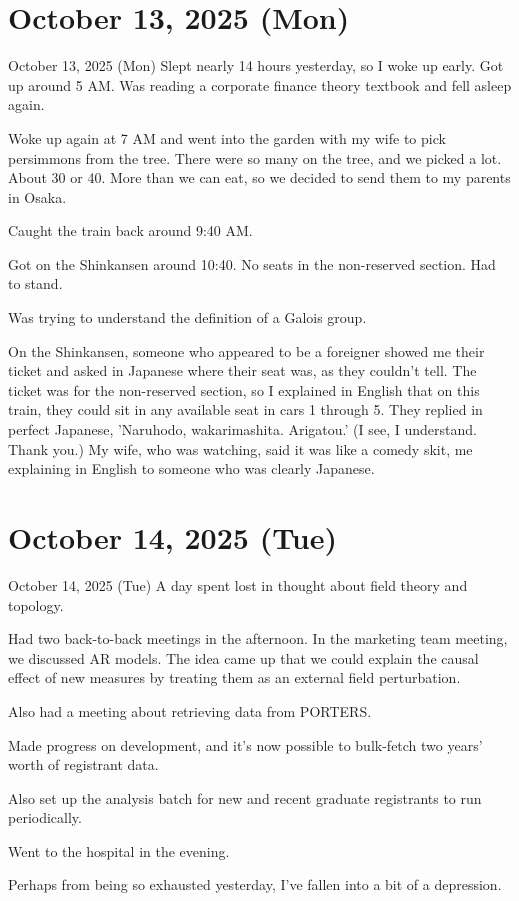 \documentclass[dvipdfmx, autodetect-engine, aspectratio=169, 10.5pt]{beamer}
\begin{document}
\section{October 13, 2025 (Mon)}

\begin{frame}{October 13, 2025 (Mon)}
\scriptsize
Slept nearly 14 hours yesterday, so I woke up early. Got up around 5 AM.
Was reading a corporate finance theory textbook and fell asleep again.

Woke up again at 7 AM and went into the garden with my wife to pick persimmons from the tree.
There were so many on the tree, and we picked a lot. About 30 or 40.
More than we can eat, so we decided to send them to my parents in Osaka.

Caught the train back around 9:40 AM.

Got on the Shinkansen around 10:40. No seats in the non-reserved section.
Had to stand.

Was trying to understand the definition of a Galois group.

On the Shinkansen, someone who appeared to be a foreigner showed me their ticket and asked in Japanese where their seat was, as they couldn't tell.
The ticket was for the non-reserved section, so I explained in English that on this train, they could sit in any available seat in cars 1 through 5.
They replied in perfect Japanese, 'Naruhodo, wakarimashita. Arigatou.' (I see, I understand. Thank you.)
My wife, who was watching, said it was like a comedy skit, me explaining in English to someone who was clearly Japanese.
\end{frame}

\section{October 14, 2025 (Tue)}

\begin{frame}{October 14, 2025 (Tue)}
A day spent lost in thought about field theory and topology.

Had two back-to-back meetings in the afternoon.
In the marketing team meeting, we discussed AR models.
The idea came up that we could explain the causal effect of new measures by treating them as an external field perturbation.

Also had a meeting about retrieving data from PORTERS.

Made progress on development, and it's now possible to bulk-fetch two years' worth of registrant data.

Also set up the analysis batch for new and recent graduate registrants to run periodically.

Went to the hospital in the evening.

Perhaps from being so exhausted yesterday, I've fallen into a bit of a depression.
\end{frame}
\end{document}
